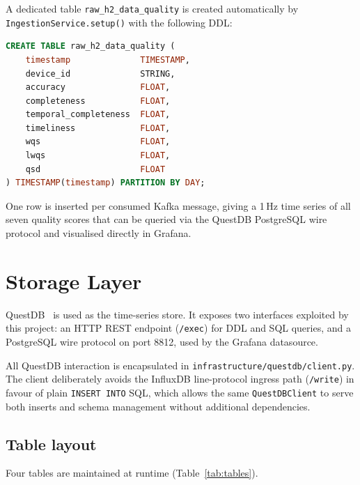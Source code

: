 A dedicated table \texttt{raw\_h2\_data\_quality} is created automatically
by \texttt{IngestionService.setup()} with the following DDL:

\begin{lstlisting}[language=SQL, caption={Quality metrics table DDL (generated by
                   QuestDBClient.create\_table).}, label={lst:quality-ddl}]
CREATE TABLE raw_h2_data_quality (
    timestamp              TIMESTAMP,
    device_id              STRING,
    accuracy               FLOAT,
    completeness           FLOAT,
    temporal_completeness  FLOAT,
    timeliness             FLOAT,
    wqs                    FLOAT,
    lwqs                   FLOAT,
    qsd                    FLOAT
) TIMESTAMP(timestamp) PARTITION BY DAY;
\end{lstlisting}

One row is inserted per consumed Kafka message, giving a 1\,Hz time series
of all seven quality scores that can be queried via the QuestDB PostgreSQL
wire protocol and visualised directly in Grafana.

\section{Storage Layer}
\label{sec:storage}

QuestDB~\cite{questdb} is used as the time-series store.
It exposes two interfaces exploited by this project:
an HTTP REST endpoint (\texttt{/exec}) for DDL and SQL queries, and a
PostgreSQL wire protocol on port 8812, used by the Grafana datasource.

All QuestDB interaction is encapsulated in \texttt{infrastructure/questdb/client.py}.
The client deliberately avoids the InfluxDB line-protocol ingress path
(\texttt{/write}) in favour of plain \texttt{INSERT INTO} SQL, which allows
the same \texttt{QuestDBClient} to serve both inserts and schema management
without additional dependencies.

\subsection{Table layout}
\label{subsec:tables}

Four tables are maintained at runtime (Table~\ref{tab:tables}).


